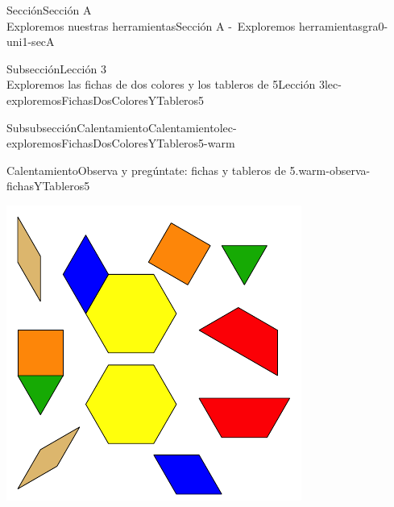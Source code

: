 \begin{sectionptx}{Sección}{{\Large Sección A\\}Exploremos nuestras herramientas}{}{Sección A -~Exploremos herramientas}{}{}{gra0-uni1-secA}
\begin{subsectionptx}{Subsección}{{\normalsize Lección 3\\[-0.05cm]}Exploremos las fichas de dos colores y los tableros de 5}{}{Lección 3}{}{}{lec-exploremosFichasDosColoresYTableros5}
\begin{subsubsectionptx}{Subsubsección}{Calentamiento}{}{Calentamiento}{}{}{lec-exploremosFichasDosColoresYTableros5-warm}
\begin{exploration}{Calentamiento}{Observa y pregúntate: fichas y tableros de 5.}{warm-observa-fichasYTableros5}
\begin{sidebyside}{2}{0.05}{0.05}{0.1}
\begin{sbspanel}{0.4}
\includegraphics[max width=\linewidth, center]{external/svg-source/tikz-file-147344.pdf}
\end{sbspanel}%
\end{sidebyside}%
\end{exploration}%
\end{subsubsectionptx}
%
%
\typeout{************************************************}
\typeout{************************************************}
%
\end{subsectionptx}
%
%
\typeout{************************************************}
\typeout{************************************************}
%

\end{sectionptx}
